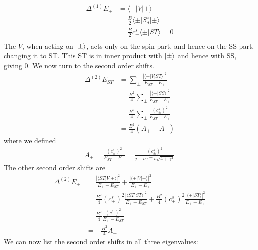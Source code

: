 \documentclass[12pt,twoside]{report}
\numberwithin{equation}{section}
\begin{document}
{\begin{equation}
\begin{aligned}
	\Delta^{(1)} E_{\pm} &= \langle \pm \vert V \vert \pm \rangle\\
			     &= \frac{B}{2} \langle \pm \vert S_d^z \vert \pm \rangle\\ 
			     &= \frac{B}{2} c^s_\pm \langle \pm \vert ST \rangle = 0\\
\end{aligned}\end{equation}
The \(V\), when acting on \(\ket{\pm}\), acts only on the spin part, and hence on the SS part, changing it to ST. This ST is in inner product with \(\ket{\pm}\) and hence with SS, giving 0. We now turn to the second order shifts.
\begin{equation}\begin{aligned}
	\Delta^{(2)} E_{ST} &= \sum_\pm \frac{ |\langle \pm \vert V \vert ST \rangle|^2 }{E_{ST} - E_\pm} \\
	&= \frac{B^2}{4}\sum_\pm \frac{ |\langle \pm \vert SS \rangle|^2 }{E_{ST} - E_\pm} \\
	&= \frac{B^2}{4}\sum_\pm \frac{(c^s_\pm)^2}{E_{ST} - E_\pm} \\
	&= \frac{B^2}{4}\left(A_+ + A_-\right)
\end{aligned}\end{equation}
where we defined
\begin{equation}\begin{aligned}
	A_\pm = \frac{\left( c^s_\pm \right)^2}{E_{ST} - E_\pm} = \frac{\left( c^s_\pm \right)^2}{j - v\gamma \mp v\sqrt{4 + \gamma^2}}
\end{aligned}\end{equation}
The other second order shifts are
\begin{equation}\begin{aligned}
	\Delta^{(2)} E_\pm &= \frac{ |\langle ST \vert V \vert \pm \rangle|^2 }{E_{\pm} - E_{ST}} + \frac{ |\langle \mp \vert V \vert \pm \rangle|^2 }{E_\pm - E_\mp} \\
	&= \frac{B^2}{4}\left( c^s_\pm \right) ^2\frac{ |\langle ST \vert ST \rangle|^2 }{E_{\pm} - E_{ST}} + \frac{B^2}{4}\left( c^s_\pm \right) ^2\frac{ |\langle \mp \vert ST \rangle|^2 }{E_\pm - E_\mp} \\
	&= \frac{B^2}{4}\frac{\left( c^s_\pm \right) ^2}{E_{\pm} - E_{ST}} \\
	&= -\frac{B^2}{4} A_\pm
\end{aligned}\end{equation}
We can now list the second order shifts in all three eigenvalues:
\begin{equation}\begin{aligned}

\end{aligned}
\end{equation}}
\end{document}
